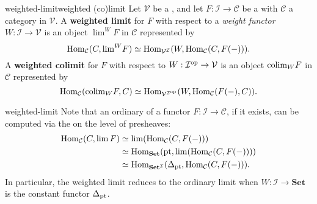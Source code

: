 \begin{topic}{weighted-limit}{weighted (co)limit}
    Let $\mathcal{V}$ be a , and let $F : \mathcal{I} \to \mathcal{C}$ be a  with $\mathcal{C}$ a category  in $\mathcal{V}$. A \textbf{weighted limit} for $F$ with respect to a \textit{weight functor} $W : \mathcal{I} \to \mathcal{V}$ is an object ${\lim}^W F$ in $\mathcal{C}$ represented by
    \[ \text{Hom}_\mathcal{C}(C, {\lim}^W F) \simeq \text{Hom}_{\mathcal{V}^\mathcal{I}}(W, \text{Hom}_\mathcal{C}(C, F(-))) . \]
    A \textbf{weighted colimit} for $F$ with respect to $W : \mathcal{I}^\textup{op} \to \mathcal{V}$ is an object ${\operatorname*{colim}}_W F$ in $\mathcal{C}$ represented by
    \[ \text{Hom}_\mathcal{C}({\operatorname*{colim}}_W F, C) \simeq \text{Hom}_{\mathcal{V}^{\mathcal{I}^\textup{op}}}(W, \text{Hom}_\mathcal{C}(F(-), C)) . \]
\end{topic}

\begin{example}{weighted-limit}
    Note that an ordinary  of a functor $F : \mathcal{I} \to \mathcal{C}$, if it exists, can be computed via the  on the level of presheaves:
    \[ \begin{aligned} \text{Hom}_\mathcal{C}(C, \lim F) &\simeq \lim (\text{Hom}_\mathcal{C}(C, F(-))) \\ &\simeq \text{Hom}_\textbf{Set}(\textup{pt}, \lim (\text{Hom}_\mathcal{C}(C, F(-)))) \\ &\simeq \text{Hom}_{\textbf{Set}^\mathcal{I}}(\Delta_{\textup{pt}}, \text{Hom}_\mathcal{C}(C, F(-))) . \end{aligned} \]
    In particular, the weighted limit reduces to the ordinary limit when $W : \mathcal{I} \to \textbf{Set}$ is the constant functor $\Delta_\textup{pt}$.
\end{example}
